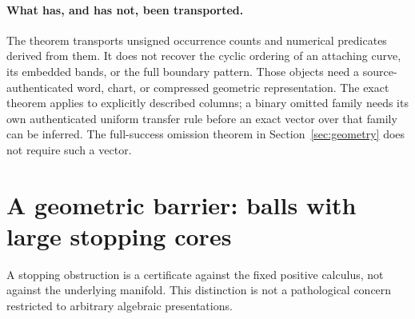 \documentclass[11pt]{article}
\theoremstyle{definition}\newtheorem{definition}[theorem]{Definition}
\theoremstyle{remark}\newtheorem{remark}[theorem]{Remark}
\begin{document}
\paragraph{What has, and has not, been transported.}
The theorem transports unsigned occurrence counts and numerical predicates derived from them. It does not recover the cyclic ordering of an attaching curve, its embedded bands, or the full boundary pattern. Those objects need a source-authenticated word, chart, or compressed geometric representation. The exact theorem applies to explicitly described columns; a binary omitted family needs its own authenticated uniform transfer rule before an exact vector over that family can be inferred. The full-success omission theorem in Section~\ref{sec:geometry} does not require such a vector.

\section{A geometric barrier: balls with large stopping cores}
\label{sec:barrier}
A stopping obstruction is a certificate against the fixed positive calculus, not against the underlying manifold. This distinction is not a pathological concern restricted to arbitrary algebraic presentations.
\end{document}
